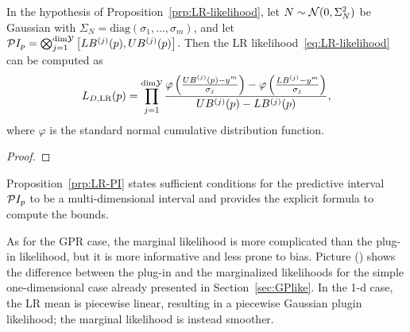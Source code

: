 \begin{prp}
    In the hypothesis of Proposition~\ref{prp:LR-likelihood}, let  $N \sim \mathcal N (0, \Sigma^2_N)$ be Gaussian with $\Sigma_N = \text{diag} (\sigma_1, \ldots, \sigma_m)$, and let $\mathcal PI_p = \bigotimes_{j=1}^{\text{dim}\mathcal Y} \left[ LB^{(j)}(p), UB^{(j)}(p)\right] $.
    Then the LR likelihood~\eqref{eq:LR-likelihood} can be computed as 
    \[
        L_{D, \text{LR}}(p) = \prod_{j=1}^{\text{dim}\mathcal Y} \frac{\varphi \left( \frac{UB^{(j)}(p) - y^m}{\sigma_j} \right) - \varphi\left( \frac{LB^{(j)} - y^m}{\sigma_j} \right)}{UB^{(j)}(p) - LB^{(j)}(p)},
    \]
    where $\varphi$ is the standard normal cumulative distribution function.

\end{prp}
\begin{proof}
\end{proof}

\begin{rmk}
    Proposition~\ref{prp:LR-PI} states sufficient conditions for the predictive interval $\mathcal PI_p$ to be a multi-dimensional interval and provides the explicit formula to compute the bounds.
\end{rmk}

As for the GPR case, the marginal likelihood is more complicated than the plug-in likelihood, but it is more informative and less prone to bias. 
Picture () shows the difference between the plug-in and the marginalized likelihoods for the simple one-dimensional case already presented in Section~\ref{sec:GPlike}. 
In the 1-d case, the LR mean is piecewise linear, resulting in a piecewise Gaussian plugin likelihood; the marginal likelihood is instead smoother.
